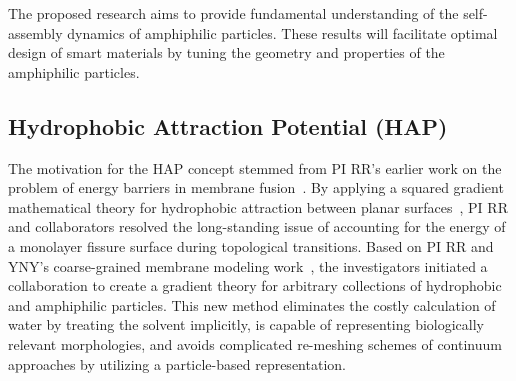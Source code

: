 %
%
The proposed research aims to provide fundamental understanding of the self-assembly dynamics of amphiphilic particles. These results will facilitate optimal design of smart materials by
tuning the geometry and properties of the amphiphilic particles.


\subsection{Hydrophobic Attraction Potential (HAP)}
\label{sec:HAP}
The motivation for the HAP concept stemmed from PI RR's earlier work on
the problem of energy barriers in membrane
fusion~\cite{RyKlYaCo16,Chetal16}. By applying a squared gradient
mathematical theory for hydrophobic attraction between planar
surfaces~\cite{Eriksson1989,Lum1999,Menshikov2017,Marcelja1977}, PI RR
and collaborators resolved the long-standing issue of accounting for the
energy of a monolayer fissure surface during topological transitions.
Based on PI RR and YNY's coarse-grained membrane modeling
work~\cite{Fu2017}, the investigators initiated a collaboration to
create a gradient theory for arbitrary collections of hydrophobic and
amphiphilic particles. This new method eliminates the costly calculation
of water by treating the solvent implicitly, is capable of representing
biologically relevant morphologies, and avoids complicated
re-meshing schemes of continuum approaches by utilizing a particle-based
representation.

